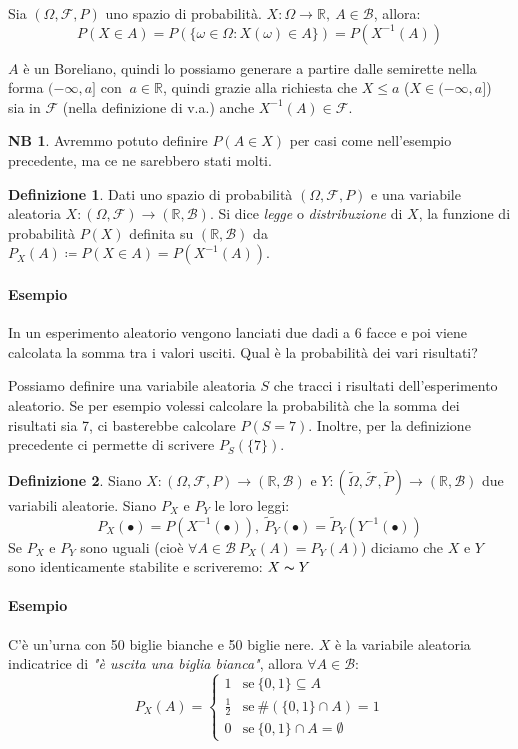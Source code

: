 \documentclass[12pt, a4paper]{report}
\theoremstyle{definition}
\newtheorem{definition}{Definizione}[section]
\newtheorem*{note}{NB}
\DeclareRobustCommand{\F}{\mathcal{F}}%
\DeclareRobustCommand{\R}{\mathbb{R}}%
\DeclareRobustCommand{\B}{\mathcal{B}}%
\DeclareRobustCommand{\probspace}{(\Omega,\F,P)}
\begin{document}
Sia $\probspace$ uno spazio di probabilità. \(X:\Omega\rightarrow\R,\ A\in\B\),
allora:
\[P(X\in A)=P(\{\omega\in\Omega:X(\omega)\in A\})=P(X^{-1}(A))\]

$A$ è un Boreliano, quindi lo possiamo generare a partire dalle semirette nella
forma \((-\infty, a]\) con \(\ a\in\R\), quindi grazie alla richiesta che \(X\leq a\)
(\(X\in(-\infty, a]\)) sia in $\F$ (nella definizione di v.a.) anche \(X^{-1}
(A)\in\F\).

\begin{note}
	Avremmo potuto definire \(P(A\in X)\) per casi come nell'esempio precedente,
	ma ce ne sarebbero stati molti.
\end{note}

\begin{definition}
	Dati uno spazio di probabilità $\probspace$ e una variabile aleatoria \(X:
	(\Omega,\F)\rightarrow(\R,\B)\). Si dice \emph{legge} o \emph{distribuzione}
	di $X$, la funzione di probabilità $P(X)$ definita su $(\R,\B)$ da \(P_X(A)
	\coloneqq P(X\in A)=P(X^{-1}(A))\).
\end{definition}

\paragraph*{Esempio}
In un esperimento aleatorio vengono lanciati due dadi a 6 facce e poi viene
calcolata la somma tra i valori usciti. Qual è la probabilità dei vari risultati?

Possiamo definire una variabile aleatoria $S$ che tracci i risultati
dell'esperimento aleatorio. Se per esempio volessi calcolare la probabilità che
la somma dei risultati sia 7, ci basterebbe calcolare \(P(S=7)\). Inoltre, per
la definizione precedente ci permette di scrivere \(P_S(\{7\})\).

\begin{definition}
	Siano \(X:\probspace\rightarrow(\R,\B)\) e \(Y:(\tilde{\Omega}, \tilde{\F},
	\tilde{P})\rightarrow(\R,\B)\) due variabili aleatorie. Siano $P_X$ e $P_Y$
	le loro leggi:
	\[P_X(\bullet)=P(X^{-1}(\bullet)),\ \tilde{P}_Y(\bullet)=\tilde{P}_Y(Y^{-1}
	(\bullet))\]
	Se $P_X$ e $P_Y$ sono uguali (cioè \(\forall A\in\B\ P_X(A)=P_Y(A)\)) diciamo
	che $X$ e $Y$ sono identicamente stabilite e scriveremo: $X\thicksim Y$
\end{definition}

\paragraph*{Esempio}
C'è un'urna con 50 biglie bianche e 50 biglie nere. $X$ è la variabile aleatoria
indicatrice di \emph{"è uscita una biglia bianca"}, allora \(\forall A\in\B\):
\[P_X(A)=\begin{cases}
	{1} & \text{se}\ {\{0,1\}\subseteq A}\\
	{\frac{1}{2}} & \text{se}\ {\#(\{0,1\}\cap A)=1}\\
	{0} & \text{se}\ {\{0,1\}\cap A=\emptyset}
\end{cases}\]
\end{document}
